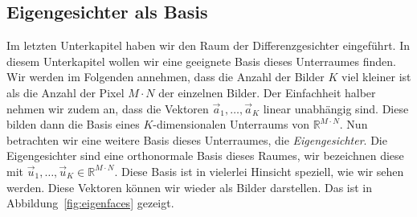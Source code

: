 \subsection{Eigengesichter als Basis}
Im letzten Unterkapitel haben wir den Raum der Differenzgesichter eingeführt.
In diesem Unterkapitel wollen wir eine geeignete Basis dieses Unterraumes finden.
Wir werden im Folgenden annehmen, dass die Anzahl der Bilder $K$ viel kleiner ist als die Anzahl der Pixel $M\cdot N$ der einzelnen Bilder.
Der Einfachheit halber nehmen wir zudem an, dass die Vektoren $\vec a_1,\ldots,\vec a_K$ linear unabhängig sind.
Diese bilden dann die Basis eines $K$-dimensionalen Unterraums von $\mathbb R^{M\cdot N}$.
Nun betrachten wir eine weitere Basis dieses Unterraumes, die \textit{Eigengesichter}.
Die Eigengesichter sind eine orthonormale Basis dieses Raumes, wir bezeichnen diese mit $\vec u_1,\dots,\vec u_K\in\mathbb R^{M\cdot N}$.
Diese Basis ist in vielerlei Hinsicht speziell, wie wir sehen werden.
Diese Vektoren können wir wieder als Bilder darstellen.
Das ist in Abbildung~\ref{fig:eigenfaces} gezeigt.

